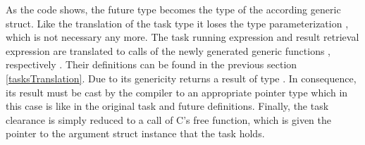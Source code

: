 As the code shows, the future type becomes the type of the according generic  struct. Like the translation of the task type it loses the type parameterization , which is not necessary any more. The task running expression  and result retrieval expression  are translated to calls of the newly generated generic functions , respectively . Their definitions can be found in the previous section \ref{tasksTranslation}. Due to its genericity  returns a result of type . In consequence, its result must be cast by the compiler to an appropriate pointer type which in this case is  like in the original task and future definitions. Finally, the task clearance is simply reduced to a call of C's free function, which is given the pointer to the argument struct instance that the task  holds.